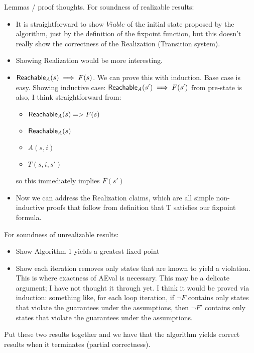 
Lemmas / proof thoughts.  For soundness of realizable results:
\begin{itemize}
    \item It is straightforward to show $Viable$ of the initial state proposed by
        the algorithm, just by the definition of the fixpoint function, but this doesn't really show the correctness of the Realization (Transition system).
    \item Showing Realization would be more interesting.
    \item ${\mathsf {Reachable}}_{A}(s) \implies F(s)$.  We can prove this with induction.  Base case is easy. Showing inductive case: ${\mathsf {Reachable}}_{A}(s') \implies F(s')$ from pre-state is also, I think straightforward from:
        \begin{itemize}
            \item ${\mathsf {Reachable}}_{A}(s) => F(s)$
            \item ${\mathsf {Reachable}}_{A}(s)$
            \item $A(s, i)$
            \item $T(s, i, s')$
        \end{itemize}
        so this immediately implies $F(s')$
    \item Now we can address the Realization claims, which are all simple non-inductive proofs that follow from definition that T satisfies our fixpoint formula.
\end{itemize}

For soundness of unrealizable results:
\begin{itemize}
    \item Show Algorithm 1 yields a greatest fixed point
    \item Show each iteration removes only states that are known to yield a violation.  This is where exactness of AEval is necessary.  This may be a delicate argument; I have not thought it through yet.  I think it would be proved via induction: something like, for each loop iteration, if $\lnot F$ contains only
        states that violate the guarantees under the assumptions, then $\lnot F'$ contains only states that violate the guarantees under the assumptions.
\end{itemize}

Put these two results together and we have that the algorithm yields correct results when it terminates (partial correctness).


